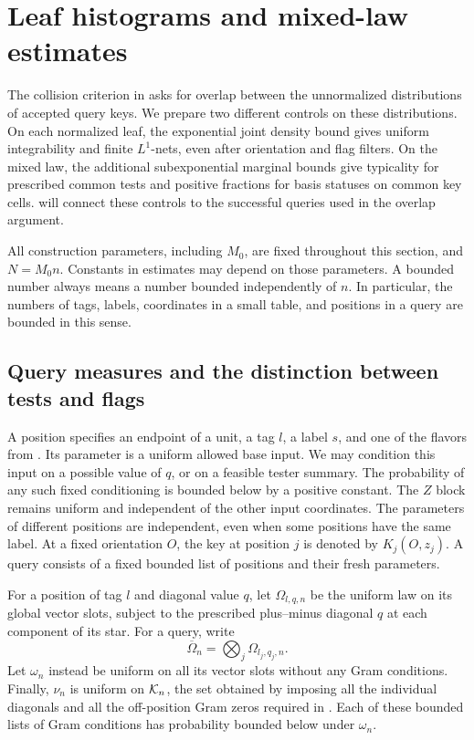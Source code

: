 \section{Leaf histograms and mixed-law estimates}\label{sec:histograms}

The collision criterion in  asks for overlap between
the unnormalized distributions of accepted query keys. We prepare two
different controls on these distributions. On each normalized leaf, the
exponential joint density bound gives uniform integrability and finite
$L^1$-nets, even after orientation and flag filters. On the mixed law, the
additional subexponential marginal bounds give typicality for prescribed
common tests and positive fractions for basis statuses on common key
cells.  will connect these controls to the
successful queries used in the overlap argument.

All construction parameters, including $M_0$, are fixed throughout this
section, and $N=M_0n$. Constants in estimates may depend on those
parameters. A bounded number always means a number bounded independently
of $n$. In particular, the numbers of tags, labels, coordinates in a
small table, and positions in a query are bounded in this sense.

\subsection{Query measures and the distinction between tests and flags}

A position specifies an endpoint of a unit, a tag $l$, a label $s$, and
one of the flavors from . Its parameter is a uniform
allowed base input. We may condition this input on a possible value of
$q$, or on a feasible tester summary. The probability of any such fixed
conditioning is bounded below by a positive constant. The $Z$ block
remains uniform and independent of the other input coordinates. The
parameters of different positions are independent, even when some
positions have the same label. At a fixed orientation $O$, the key at
position $j$ is denoted by $K_j(O,z_j)$. A query consists of a fixed
bounded list of positions and their fresh parameters.

For a position of tag $l$ and diagonal value $q$, let
$\Omega_{l,q,n}$ be the uniform law on its global vector slots, subject
to the prescribed plus--minus diagonal $q$ at each component of its star.
For a query, write
\[
 \overline\Omega_n=\bigotimes_j\Omega_{l_j,q_j,n}.
\]
Let $\omega_n$ instead be uniform on all its vector slots without any
Gram conditions. Finally, $\nu_n$ is uniform on $\mathcal K_n$, the set obtained
by imposing all the individual diagonals and all the off-position Gram
zeros required in . Each of these bounded lists of
Gram conditions has probability bounded below under $\omega_n$.

